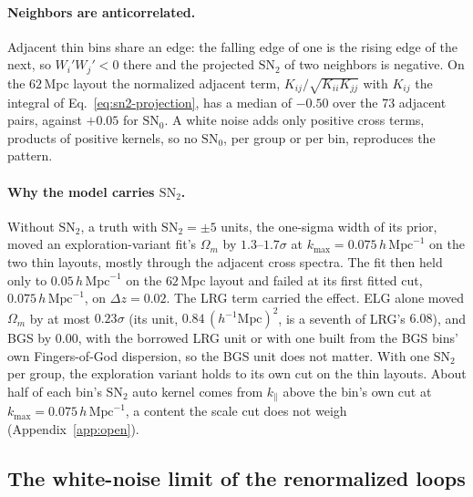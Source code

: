 \documentclass[11pt]{article}
\newcommand{\kmax}{k_{\mathrm{max}}}
\newcommand{\hMpc}{\,h\,\mathrm{Mpc}^{-1}}
\newcommand{\SNz}{\mathrm{SN}_0}
\newcommand{\SNt}{\mathrm{SN}_2}
\begin{document}
\paragraph{Neighbors are anticorrelated.}  Adjacent thin bins share an
edge: the falling edge of one is the rising edge of the next, so
$W_i'W_j' < 0$ there and the projected $\SNt$ of two neighbors is
negative.  On the $62$\,Mpc layout the normalized adjacent term,
$K_{ij}/\sqrt{K_{ii}K_{jj}}$ with $K_{ij}$ the integral of
Eq.~\eqref{eq:sn2-projection}, has a median of $-0.50$ over the 73
adjacent pairs, against $+0.05$ for $\SNz$.  A white noise adds only
positive cross terms, products of positive kernels, so no $\SNz$, per
group or per bin, reproduces the pattern.

\paragraph{Why the model carries $\SNt$.}  Without $\SNt$, a truth with
$\SNt = \pm5$ units, the one-sigma width of its prior, moved an
exploration-variant
fit's
$\Omega_m$ by $1.3$--$1.7\sigma$ at $\kmax = 0.075\hMpc$ on the two
thin layouts, mostly through the adjacent cross spectra.  The fit then
held only to $0.05\hMpc$ on the $62$\,Mpc layout and failed at its
first fitted cut, $0.075\hMpc$, on $\Delta z = 0.02$.  The LRG term
carried the effect.  ELG alone moved $\Omega_m$ by at most
$0.23\sigma$ (its unit, $0.84\,(h^{-1}\mathrm{Mpc})^2$, is a seventh of
LRG's $6.08$), and BGS by $0.00$, with the borrowed LRG unit or with
one built from the BGS bins' own Fingers-of-God dispersion, so the BGS
unit does not matter.  With one $\SNt$ per group, the exploration
variant holds to its
own cut on the thin layouts.  About half
of each bin's $\SNt$ auto kernel comes from $k_\parallel$ above the
bin's own cut at $\kmax = 0.075\hMpc$, a content the scale cut does
not weigh (Appendix~\ref{app:open}).

\subsection{The white-noise limit of the renormalized loops}
\label{sec:whitenoise}
\end{document}

